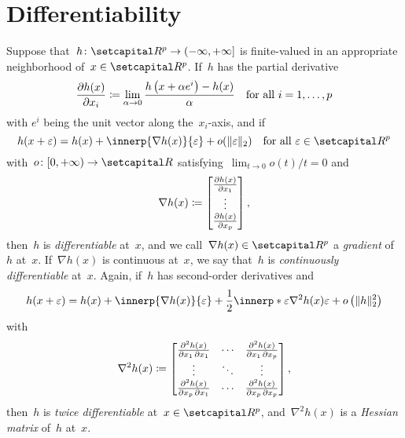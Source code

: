 \documentclass[../main]{subfiles}
\begin{document}
\section{Differentiability}
Suppose that~$h \colon \setR^p \to (-\infty, +\infty]$ is finite-valued in an appropriate neighborhood of~$x \in \setR^p$.
If~$h$ has the partial derivative
\begin{equation} \label{eq:pdv}
    \pdv{h(x)}{x_i} \coloneqq \lim_{\alpha \to 0} \frac{h\left(x + \alpha e^i\right) - h(x)}{\alpha} \quad \text{for all~$i = 1, \dots, p$}
\end{equation} 
with $e^i$ being the unit vector along the~$x_i$-axis, and if
\begin{equation} \label{eq:first_order_approximation}
    h(x + \varepsilon) = h(x) + \innerp{\nabla h(x)}{\varepsilon} + o(\norm{\varepsilon}_2) \forallcondition{\varepsilon \in \setR^p}
\end{equation} 
with~$o \colon [0, +\infty) \to \setR$ satisfying~$\lim_{t \to 0} o(t) / t = 0$ and
\begin{equation} \label{eq:grad}
    \nabla h(x) \coloneqq 
    \begin{bmatrix} 
        \pdv{h(x)}{x_1} \\ \vdots \\ \pdv{h(x)}{x_p} 
    \end{bmatrix}
,\end{equation} 
then~$h$ is \emph{differentiable} at~$x$, and we call~$\nabla h(x) \in \setR^p$ a \emph{gradient} of~$h$ at~$x$.
If~$\nabla h(x)$ is continuous at~$x$, we say that~$h$ is \emph{continuously differentiable} at~$x$.
Again, if~$h$ has second-order derivatives and
\begin{equation}
    h(x + \varepsilon) = h(x) + \innerp{\nabla h(x)}{\varepsilon} + \frac{1}{2} \innerp*{\varepsilon}{\nabla^2 h(x) \varepsilon} + o\left(\norm{h}_2^2\right)
\end{equation} 
with
\begin{equation} \label{eq:hess}
    \nabla^2 h(x) \coloneqq
    \begin{bmatrix} 
        \pdv{h(x)}{x_1,x_1} & \cdots & \pdv{h(x)}{x_1,x_p} \\
        \vdots & \ddots & \vdots \\
        \pdv{h(x)}{x_p,x_1} & \cdots & \pdv{h(x)}{x_p,x_p} \\
    \end{bmatrix} 
,\end{equation} 
then~$h$ is \emph{twice differentiable} at~$x \in \setR^p$, and~$\nabla^2 h(x)$ is a \emph{Hessian matrix} of~$h$ at~$x$.
\end{document}
